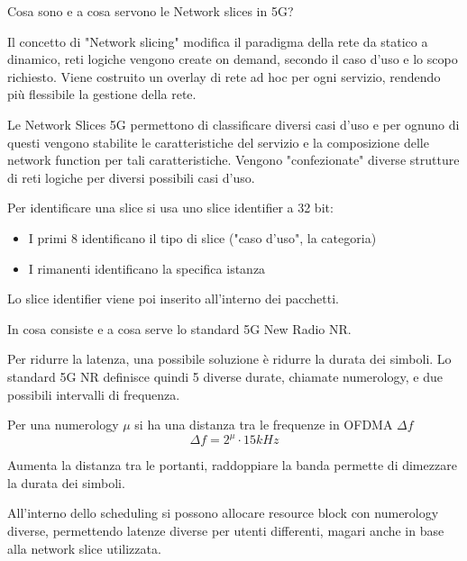 \begin{questions}
    \question Cosa sono e a cosa servono le Network slices in 5G?
    
    \begin{solution}
        Il concetto di "Network slicing" modifica il paradigma della rete da statico a dinamico, reti logiche vengono create on demand, secondo il caso d'uso e lo scopo richiesto. Viene costruito un overlay di rete ad hoc per ogni servizio, rendendo più flessibile la gestione della rete.
        
        Le Network Slices 5G permettono di classificare diversi casi d'uso e per ognuno di questi vengono stabilite le caratteristiche del servizio e la composizione delle network function per tali caratteristiche. Vengono "confezionate" diverse strutture di reti logiche per diversi possibili casi d'uso.
        
        Per identificare una slice si usa uno slice identifier a 32 bit: 
        \begin{itemize}
            \item I primi 8 identificano il tipo di slice ("caso d'uso", la categoria)
            
            \item I rimanenti identificano la specifica istanza
        \end{itemize}
        
        Lo slice identifier viene poi inserito all'interno dei pacchetti.
    \end{solution}
    
    \question In cosa consiste e a cosa serve lo standard 5G New Radio NR.
    
    \begin{solution}
        Per ridurre la latenza, una possibile soluzione è ridurre la durata dei simboli. Lo standard 5G NR definisce quindi 5 diverse durate, chiamate numerology, e due possibili intervalli di frequenza. 
        
        Per una numerology $\mu$ si ha una distanza tra le frequenze in OFDMA $\Delta f$
        $$ \Delta f = 2^\mu \cdot 15kHz $$
        
        Aumenta la distanza tra le portanti, raddoppiare la banda permette di dimezzare la durata dei simboli.
        
        All'interno dello scheduling si possono allocare resource block con numerology diverse, permettendo latenze diverse per utenti differenti, magari anche in base alla network slice utilizzata.        
    \end{solution}
\end{questions}
